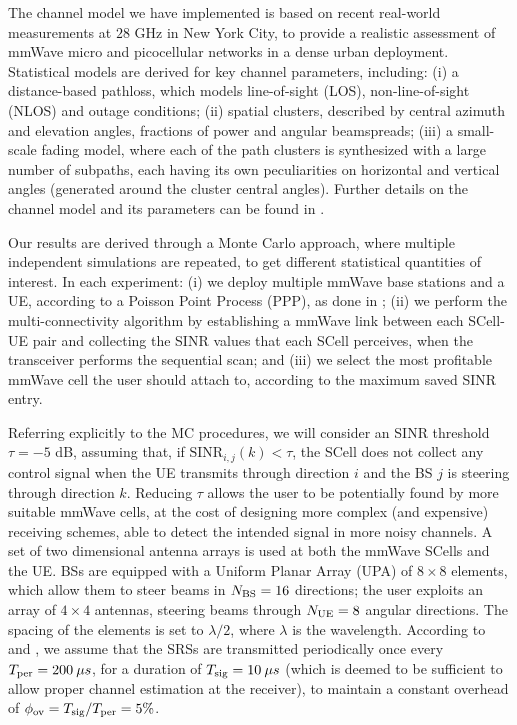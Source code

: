 \documentclass[conference,a4paper]{IEEEtran}
\begin{document}
The channel model we have implemented is based on recent real-world measurements at $28$ GHz in New York City, to provide a realistic assessment of mmWave micro and picocellular networks in a dense urban deployment. Statistical models are derived for key channel parameters, including: (i) a distance-based pathloss, which models line-of-sight (LOS), non-line-of-sight (NLOS) and outage conditions; (ii) spatial clusters, described by central azimuth and elevation angles, fractions of power and angular beamspreads;  (iii) a small-scale fading model, where each of the path clusters is synthesized with a large number of subpaths, each  having its own peculiarities on horizontal and vertical angles (generated around the cluster central angles). Further details on the channel model and its parameters can be found in \cite{Mustafa,ns3_nokia,rappaport_channel_model}. 


Our results are derived through a Monte Carlo approach, where multiple independent simulations are repeated, to  get different statistical quantities of interest. In each experiment: (i) we deploy multiple mmWave base stations and a UE, according to a Poisson Point Process (PPP), as done in \cite{Heath}; (ii) we perform the multi-connectivity algorithm by establishing a mmWave link between each SCell-UE pair and collecting the SINR values that each SCell perceives, when the transceiver performs the sequential scan; and (iii) we select the most profitable mmWave cell the user should attach to, according to the maximum saved SINR entry.



Referring explicitly to the MC procedures, we will consider an SINR threshold $\tau = -5$ dB, assuming that, if $\text{SINR}_{i,j}(k) < \tau$,  the SCell does not collect any control signal when the UE  transmits through direction $i$  and the BS $j$ is steering through direction $k$. 
Reducing  $\tau$ allows the user to be potentially found by more suitable mmWave cells, at the cost of designing more complex (and expensive) receiving schemes, able to detect the intended signal in more noisy channels. A set of two dimensional antenna arrays is used at both the mmWave SCells and the UE. BSs are equipped with a Uniform Planar Array (UPA) of $8 \times 8$ elements, which allow them to steer beams in $N_{\rm BS}=16$ directions; the user exploits an array of $4 \times 4$ antennas, steering beams through $N_{\rm UE}=8$ angular directions. The spacing of the elements is set to $\lambda/2$, where $\lambda$ is the wavelength.  
According to \cite{Barati} and \cite{CISS}, we assume that the SRSs  are transmitted periodically once every $T_{\rm per} = 200 \: \mu s$, for a duration of $T_{\rm sig}=10 \: \mu s$ (which is deemed to be sufficient to allow proper channel estimation at the receiver), to maintain a constant overhead of $\phi_{\rm ov} = T_{\rm sig}/T_{\rm per} = 5 \%$.
\end{document}
